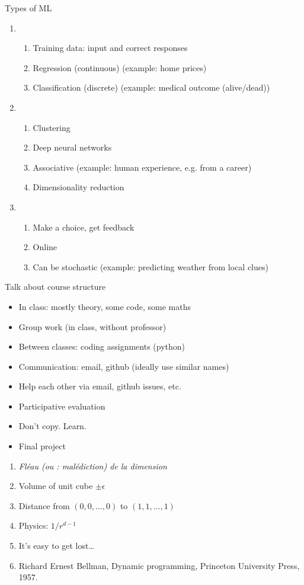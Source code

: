 Types of ML
\begin{enumerate}
\item {}
  \begin{enumerate}
  \item Training data: input and correct responses
  \item Regression (continuous) (example: home prices)
  \item Classification (discrete) (example: medical outcome (alive/dead))
  \end{enumerate}
\item {}
  \begin{enumerate}
  \item Clustering
  \item Deep neural networks
  \item Associative (example: human experience, e.g. from a career)
  \item Dimensionality reduction
  \end{enumerate}
\item {}
  \begin{enumerate}
  \item Make a choice, get feedback
  \item Online
  \item Can be stochastic (example: predicting weather from local clues)
  \end{enumerate}
\end{enumerate}

Talk about course structure
\begin{itemize}
\item In class: mostly theory, some code, some maths
\item Group work (in class, without professor)
\item Between classes: coding assignments (python)
\item Communication: email, github (ideally use similar names)
\item Help each other via email, github issues, etc.
\item Participative evaluation
\item Don't copy.  Learn.
\item Final project
\end{itemize}

\begin{enumerate}
\item \textit{Fléau (ou : malédiction) de la dimension}
\item Volume of unit cube $\pm\epsilon$
\item Distance from $(0,0,\ldots,0)$ to $(1,1,\ldots,1)$
\item Physics: $1/r^{d-1}$
\item It's easy to get lost\dots
\item Richard Ernest Bellman, Dynamic programming, Princeton
  University Press, 1957.
\end{enumerate}

